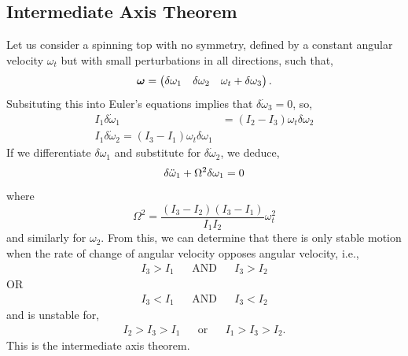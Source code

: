 \documentclass{book}
\begin{document}
\subsection{Intermediate Axis Theorem}
Let us consider a spinning top with no symmetry, defined by a constant angular velocity $\omega_t$ but with small perturbations in all directions, such that,
\begin{equation}
	\vb*{\omega} = \begin{pmatrix}
		\delta \omega_1 & \delta \omega_2 & \omega_t + \delta\omega_3
	\end{pmatrix}.
\end{equation}
Subsituting this into Euler's equations implies that $\delta \Dot{\omega}_3 = 0$, so,
\begin{align}
	I_1\delta\Dot{\omega}_1 &= (I_2 - I_3)\omega_t\delta\omega_2 \\
	I_1\delta\Dot{\omega}_2 = (I_3 - I_1)\omega_t\delta\omega_1\end{align}
If we differentiate $\delta \omega_1$ and substitute for $\delta\Dot{\omega}_2$, we deduce,
\begin{equation}
	\delta \Ddot{\omega}_1 + \Omega^2\delta\omega_1 = 0
\end{equation}
where
\begin{equation}
	\Omega^2 = \frac{(I_3 - I_2)(I_3-I_1)}{I_1I_2}\omega_t^2
\end{equation}
and similarly for $\omega_2$. From this, we can determine that there is only stable motion when the rate of change of angular velocity opposes angular velocity, i.e.,
\begin{align}
	I_3 > I_1 && \text{AND} && I_3 > I_2
\end{align}
OR
\begin{align}
	I_3 < I_1 && \text{AND} && I_3 < I_2
\end{align}
and is unstable for,
\begin{align}
	I_2 > I_3 > I_1 && \text{or} && I_1 > I_3 > I_2.
\end{align}
This is the intermediate axis theorem. 
\end{document}
